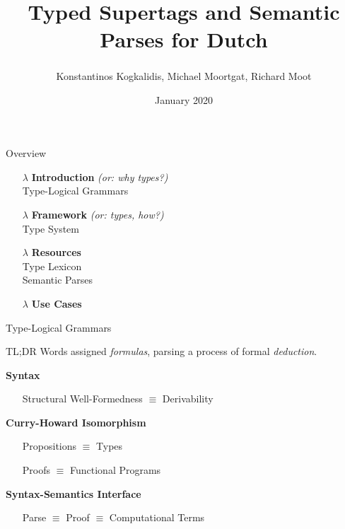 \documentclass{beamer}
\title{Typed Supertags and Semantic Parses for Dutch}
\institute{\owl UiL-OTS Utrecht University, \flamingo Universit{\'e} de Montpellier, CNRS}
\author{Konstantinos Kogkalidis\textsuperscript{\owl}, Michael Moortgat\textsuperscript{\owl}, Richard Moot\textsuperscript{\flamingo}}
\date{January 2020}
\begin{document}
\maketitle

\begin{frame}{Overview}
	\begin{itemize}
	\item[$\lambda$] {\textbf{Introduction}  {\footnotesize\textit{(or: why types?)}}\\
	 Type-Logical Grammars
	 }
	\item[$\lambda$] {\textbf{Framework} {\footnotesize\textit{(or: types, how?)}}\\
	Type System}
	\item[$\lambda$] {\textbf{Resources} \\
	Type Lexicon\\
	Semantic Parses
	}
	\item[$\lambda$] \textbf{Use Cases}
	\end{itemize}
\end{frame}

\begin{frame}{Type-Logical Grammars}

	\begin{block}{TL;DR}
		Words assigned \textit{formulas}, 
parsing a process of formal \textit{deduction}.
	\end{block}
	\vfill
	
	\textbf{Syntax}
	\begin{itemize}
	\item[] Structural Well-Formedness $\equiv$ Derivability
	\end{itemize}
	\vfill
	
 	\pause	
	\textbf{Curry-Howard Isomorphism}
	\begin{itemize}
	\item[] Propositions $\equiv$ Types
	\item[] Proofs $\equiv$ Functional Programs
	\end{itemize}
	\vfill
	
	\textbf{Syntax-Semantics Interface}
	\begin{itemize}
	\item[] Parse $\equiv$ Proof $\equiv$ Computational Terms
	\end{itemize}
\end{frame}
\end{document}
